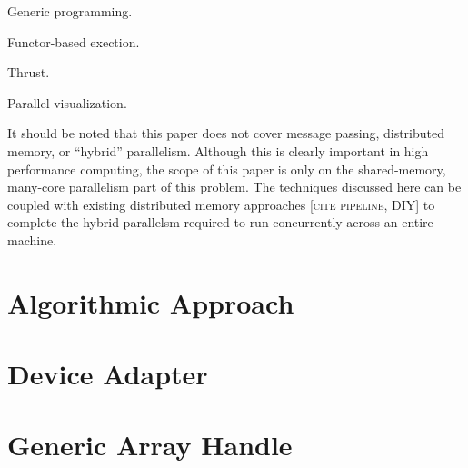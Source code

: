 \documentclass{sig-alternate}
\newcommand{\fix}[1]{{\color{red}\textsc{[#1]}}}
\begin{document}
Generic programming.

Functor-based exection.

Thrust.

Parallel visualization.

It should be noted that this paper does not cover message passing,
distributed memory, or ``hybrid'' parallelism.  Although this is clearly
important in high performance computing, the scope of this paper is only on
the shared-memory, many-core parallelism part of this problem.  The
techniques discussed here can be coupled with existing distributed memory
approaches \fix{cite pipeline, DIY} to complete the hybrid parallelsm
required to run concurrently across an entire machine.

\section{Algorithmic Approach}

\section{Device Adapter}

\section{Generic Array Handle}



\end{document}
